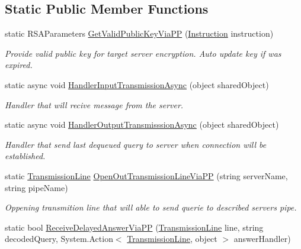 \subsection*{Static Public Member Functions}
\begin{DoxyCompactItemize}
\item 
static R\+S\+A\+Parameters \mbox{\hyperlink{class_uniform_client_1_1_base_client_ac9dcfa2f28b9fcbaaf0a0eba456ce507}{Get\+Valid\+Public\+Key\+Via\+PP}} (\mbox{\hyperlink{class_pipes_provider_1_1_networking_1_1_routing_1_1_instruction}{Instruction}} instruction)
\begin{DoxyCompactList}\small\item\em Provide valid public key for target server encryption. Auto update key if was expired. \end{DoxyCompactList}\item 
static async void \mbox{\hyperlink{class_uniform_client_1_1_base_client_a8b0bf0f5c032239a7b1bdc73d2d5ad3d}{Handler\+Input\+Transmission\+Async}} (object shared\+Object)
\begin{DoxyCompactList}\small\item\em Handler that will recive message from the server. \end{DoxyCompactList}\item 
static async void \mbox{\hyperlink{class_uniform_client_1_1_base_client_a233b9fc7f1cdc4df399115938afd917d}{Handler\+Output\+Transmisssion\+Async}} (object shared\+Object)
\begin{DoxyCompactList}\small\item\em Handler that send last dequeued query to server when connection will be established. \end{DoxyCompactList}\item 
static \mbox{\hyperlink{class_pipes_provider_1_1_client_1_1_transmission_line}{Transmission\+Line}} \mbox{\hyperlink{class_uniform_client_1_1_base_client_a56ba8d0360e3c65a69d2d69db878ec23}{Open\+Out\+Transmission\+Line\+Via\+PP}} (string server\+Name, string pipe\+Name)
\begin{DoxyCompactList}\small\item\em Oppening transmition line that will able to send querie to described server\textquotesingle{}s pipe. \end{DoxyCompactList}\item 
static bool \mbox{\hyperlink{class_uniform_client_1_1_base_client_aa6a13dcf0a4dbefd681cf7eb333813aa}{Receive\+Delayed\+Answer\+Via\+PP}} (\mbox{\hyperlink{class_pipes_provider_1_1_client_1_1_transmission_line}{Transmission\+Line}} line, string decoded\+Query, System.\+Action$<$ \mbox{\hyperlink{class_pipes_provider_1_1_client_1_1_transmission_line}{Transmission\+Line}}, object $>$ answer\+Handler)

\end{DoxyCompactItemize}
